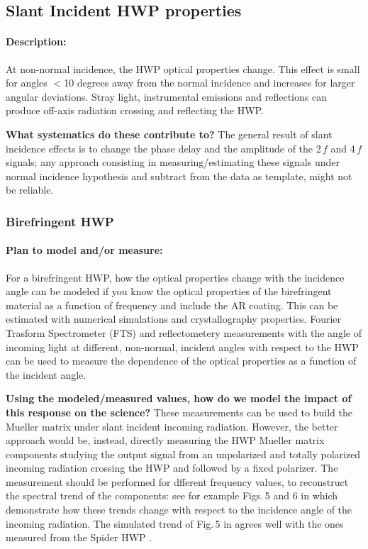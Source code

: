 \subsection{Slant Incident HWP properties}

\paragraph{Description:}
At non-normal incidence, the HWP optical properties change. This effect is small for angles $<$10 degrees away from the normal incidence and increases for larger angular deviations. Stray light, instrumental emissions and reflections can produce off-axis radiation crossing and reflecting the HWP.

\textbf{What systematics do these contribute to?} The general result of slant incidence effects is to change the phase delay and the amplitude of the 2$\,f$ and 4$\,f$ signals; any approach consisting in measuring/estimating these signals under normal incidence hypothesis and subtract from the data as template, might not be reliable. 

\subsubsection{Birefringent HWP}\label{slant_biri}

\paragraph{Plan to model and/or measure:}
For a birefringent HWP, how the optical properties change with the incidence angle can be modeled if you know the optical properties of the birefringent material as a function of frequency and include the AR coating. This can be estimated with numerical simulations and crystallography properties. Fourier Trasform Spectrometer (FTS) and reflectometery measurements with the angle of incoming light at different, non-normal, incident angles with respect to the HWP can be used to measure the dependence of the optical properties as a function of the incident angle.

\textbf{Using the modeled/measured values, how do we model the impact of this response on the science?}
These measurements can be used to build the Mueller matrix under slant incident incoming radiation. However, the better approach would be, instead, directly measuring the HWP Mueller matrix components studying the output signal from an unpolarized and totally polarized incoming radiation crossing the HWP and followed by a fixed polarizer. The measurement should be performed for dfferent frequency values, to reconstruct the spectral trend of the components: see for example Figs.\,5 and 6 in \cite{Salatino17} which demonstrate how these trends change with respect to the incidence angle of the incoming radiation. The simulated trend of Fig.\,5 in \cite{Salatino17} agrees well with the ones measured from the Spider HWP \cite{Bryan10}.



